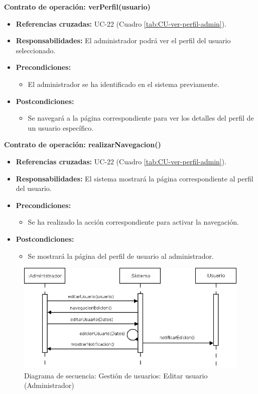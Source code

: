 \textbf{Contrato de operación: verPerfil(usuario)}
\begin{itemize}
\item \textbf{Referencias cruzadas:} UC-22 (Cuadro \ref{tab:CU-ver-perfil-admin}).
\item \textbf{Responsabilidades:} El administrador podrá ver el perfil del usuario seleccionado.
\item \textbf{Precondiciones:} 
 \begin{itemize}
\item El administrador se ha identificado en el sistema previamente.
\end {itemize}
\item \textbf{Postcondiciones:} 
 \begin{itemize}
\item Se navegará a la página correspondiente para ver los detalles del perfil de un usuario específico.
\end {itemize}
\end {itemize}

\textbf{Contrato de operación: realizarNavegacion()}
\begin{itemize}
\item \textbf{Referencias cruzadas:} UC-22 (Cuadro \ref{tab:CU-ver-perfil-admin}).
\item \textbf{Responsabilidades:} El sistema mostrará la página correspondiente al perfil del usuario.
\item \textbf{Precondiciones:} 
 \begin{itemize}
\item Se ha realizado la acción correspondiente para activar la navegación.
\end {itemize}
\item \textbf{Postcondiciones:} 
 \begin{itemize}
\item Se mostrará la página del perfil de usuario al administrador.
\end {itemize}
\end {itemize}


\vspace{10mm}

\begin{figure}[H]
\centering
  \includegraphics[scale=.50]{img/secuencias/gestion-usuarios-editar-usuario-administrador.jpeg}
  \caption{Diagrama de secuencia: Gestión de usuarios: Editar usuario (Administrador)}
  \label{fig:secuencia-gestion-usuarios-editar-usuario-administrador}
\end{figure}

